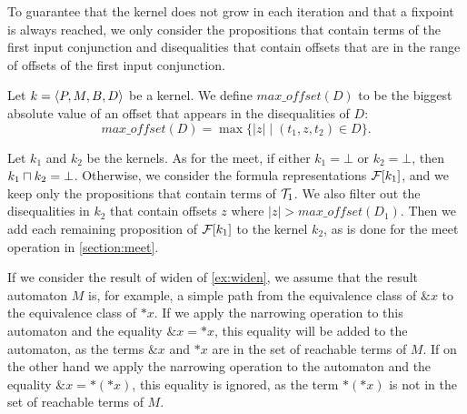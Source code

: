 To guarantee that the kernel does not grow in each iteration
and that a fixpoint is always reached, we only consider the propositions that contain terms of the first input conjunction
and disequalities that contain offsets that are in the range of offsets of the first input conjunction.

Let $k = \langle P,M,B,D\rangle$ be a kernel. We define $max\_offset(D)$ to be the biggest absolute value of an offset that appears in the disequalities of $D$:
\[
max\_offset(D) = \max\{ \lvert z \rvert \mid (t_1,z,t_2) \in D \}.
\]

Let $k_1$ and $k_2$ be the kernels.
As for the meet, if either $k_1 = \bot$ or $k_2 = \bot$, then $k_1 \sqcap k_2 = \bot$.
Otherwise, we consider the formula representations $\mathcal{F}[k_1]$, and we keep only the propositions that contain terms of $\mathcal{T}_1$.
We also filter out the disequalities in $k_2$ that contain offsets $z$ where $\lvert z \rvert > max\_offset(D_1)$.
Then we add each remaining proposition of $\mathcal{F}[k_1]$ to the kernel $k_2$,
as is done for the meet operation in \cref{section:meet}.

\begin{example}
    If we consider the result of widen of \cref{ex:widen}, we assume that the result automaton $M$
    is, for example, a simple path from the equivalence class of $\&x$ to the equivalence class of $*x$.
    If we apply the narrowing operation to this automaton and the equality $\&x = *x$, this equality will
    be added to the automaton, as the terms $\&x$ and $*x$ are in the set of reachable terms of $M$.
    If on the other hand we apply the narrowing operation to the automaton and the equality $\&x = *(*x)$,
    this equality is ignored, as the term $*(*x)$ is not in the set of reachable terms of $M$.
\end{example}

